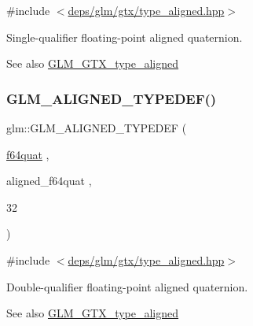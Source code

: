 {\ttfamily \#include $<$\hyperlink{gtx_2type__aligned_8hpp}{deps/glm/gtx/type\+\_\+aligned.\+hpp}$>$}

Single-\/qualifier floating-\/point aligned quaternion. \begin{DoxySeeAlso}{See also}
\hyperlink{group__gtx__type__aligned}{G\+L\+M\+\_\+\+G\+T\+X\+\_\+type\+\_\+aligned} 
\end{DoxySeeAlso}
\mbox{\label{group__gtx__type__aligned_ga95cc03b8b475993fa50e05e38e203303}} 
\subsubsection{\texorpdfstring{G\+L\+M\+\_\+\+A\+L\+I\+G\+N\+E\+D\+\_\+\+T\+Y\+P\+E\+D\+E\+F()}{GLM\_ALIGNED\_TYPEDEF()}\hspace{0.1cm}{\footnotesize\ttfamily [209/209]}}
{\footnotesize\ttfamily glm\+::\+G\+L\+M\+\_\+\+A\+L\+I\+G\+N\+E\+D\+\_\+\+T\+Y\+P\+E\+D\+EF (\begin{DoxyParamCaption}\item[{\hyperlink{group__gtc__type__precision_ga5b54d7b36fbee5e271f73e6ed74e7172}{f64quat}}]{,  }\item[{aligned\+\_\+f64quat}]{,  }\item[{32}]{ }\end{DoxyParamCaption})}



{\ttfamily \#include $<$\hyperlink{gtx_2type__aligned_8hpp}{deps/glm/gtx/type\+\_\+aligned.\+hpp}$>$}

Double-\/qualifier floating-\/point aligned quaternion. \begin{DoxySeeAlso}{See also}
\hyperlink{group__gtx__type__aligned}{G\+L\+M\+\_\+\+G\+T\+X\+\_\+type\+\_\+aligned} 
\end{DoxySeeAlso}
